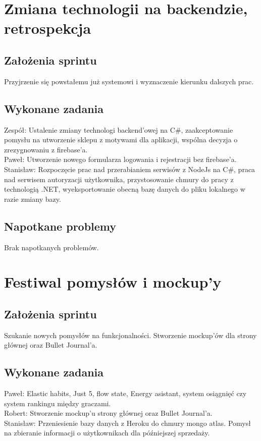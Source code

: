 \documentclass[a4paper,11pt]{report}
\begin{document}
\section {Zmiana technologii na backendzie, retrospekcja}
\subsection {Założenia sprintu}
Przyjrzenie się powstałemu już systemowi i wyznaczenie kierunku dalszych prac.
\subsection {Wykonane zadania}
Zespół: Ustalenie zmiany technologi backend'owej na C\#, zaakceptowanie pomysłu na utworzenie sklepu z motywami dla aplikacji, wspólna decyzja o zrezygnowaniu z firebase'a.\\
Paweł: Utworzenie nowego formularza logowania i rejestracji bez firebase'a.\\
Stanisław: Rozpoczęcie prac nad przerabianiem serwisów z NodeJs na C\#, praca nad serwisem autoryzacji użytkownika, przystosowanie chmury do pracy z technologią .NET, wyeksportowanie obecną bazę danych do pliku lokalnego w razie zmiany bazy.\\
\subsection {Napotkane problemy}
Brak napotkanych problemów.

\section {Festiwal pomysłów i mockup'y}
\subsection {Założenia sprintu}
Szukanie nowych pomysłów na funkcjonalności. Stworzenie mockup'ów dla strony głównej oraz Bullet Journal'a. 
\subsection {Wykonane zadania}
Paweł: Elastic habits, Just 5, flow state, Energy asistant, system osiągnięć czy system rankingu między graczami.\\
Robert: Stworzenie mockup'u strony głównej oraz Bullet Journal'a.\\
Stanisław: Przeniesienie bazy danych z Heroku do chmury mongo atlas. Pomysł na zbieranie informacji o użytkownikach dla późniejszej sprzedaży.\\
\end{document}
